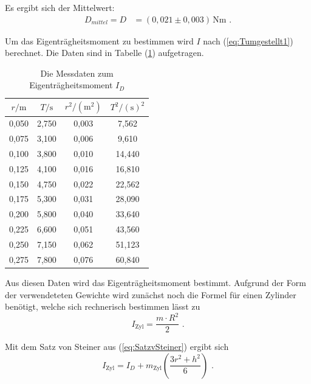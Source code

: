 Es ergibt sich der Mittelwert:
\begin{align*}
  D_{mittel} = D  & = (0,021 \pm 0,003) \, \unit{\newton\meter} \text{ .}
\end{align*}

Um das Eigenträgheitsmoment zu bestimmen wird $I$ nach (\ref{eq:Tumgestellt1}) berechnet.
Die Daten sind in Tabelle (\ref{tab:Eigenträgheitsmoment}) aufgetragen.

\begin{table}
  \centering
  \caption{Die Messdaten zum Eigenträgheitsmoment $I_{D}$}
  \label{tab:Eigenträgheitsmoment}
  \begin{tabular}{c c c c}
    \toprule
    $r / \unit\meter$  &  $T / \unit\second$ & $r^2 / (\unit\meter^2)$  & $T^2 / (\unit\second)^2$\\
    \midrule
      0,050   & 2,750   & 0,003   &  7,562  \\
      0,075   & 3,100   & 0,006   &  9,610  \\
      0,100   & 3,800   & 0,010   & 14,440  \\
      0,125   & 4,100   & 0,016   & 16,810  \\
      0,150   & 4,750   & 0,022   & 22,562  \\
      0,175   & 5,300   & 0,031   & 28,090  \\
      0,200   & 5,800   & 0,040   & 33,640  \\
      0,225   & 6,600   & 0,051   & 43,560  \\
      0,250   & 7,150   & 0,062   & 51,123  \\
      0,275   & 7,800   & 0,076   & 60,840  \\
    \bottomrule
    \end{tabular}
\end{table}

Aus diesen Daten wird das Eigenträgheitsmoment bestimmt.
Aufgrund der Form der verwendeteten Gewichte wird zunächst noch die Formel für einen Zylinder benötigt,
welche sich rechnerisch bestimmen lässt zu
\begin{equation*}
  I_{\text{Zyl}} = \frac{m \cdot R^2} {2} \text{ .}
\end{equation*}

Mit dem Satz von Steiner aus (\ref{eq:SatzvSteiner}) ergibt sich
\begin{equation} \label{eq:IZyl}
  I_{\text{Zyl}} = I_{D} + m_{\text{Zyl}}  \left( \frac{3 r^2 + h^2}{6} \right) \text{ .}
\end{equation}

